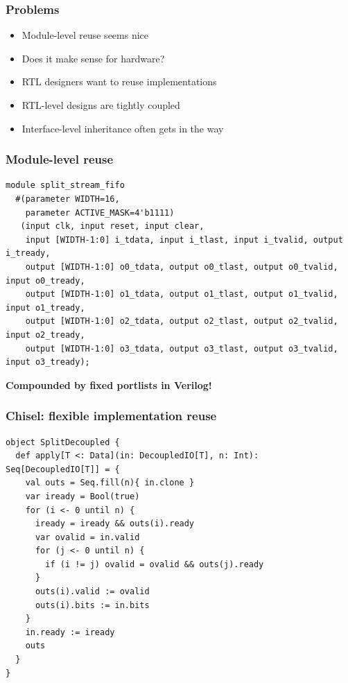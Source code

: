 \documentclass{beamer}
\begin{document}
\begin{frame}
\frametitle{Problems}
\begin{itemize}
\item Module-level reuse seems nice
\item Does it make sense for hardware?
\item<2-> RTL designers want to reuse implementations
\item<2-> RTL-level designs are tightly coupled
\item<2-> Interface-level inheritance often gets in the way
\end{itemize}
\end{frame}

\begin{frame}[fragile]
\frametitle{Module-level reuse}
\tiny
\begin{verbatim}
module split_stream_fifo
  #(parameter WIDTH=16,
    parameter ACTIVE_MASK=4'b1111)
   (input clk, input reset, input clear,
    input [WIDTH-1:0] i_tdata, input i_tlast, input i_tvalid, output i_tready,
    output [WIDTH-1:0] o0_tdata, output o0_tlast, output o0_tvalid, input o0_tready,
    output [WIDTH-1:0] o1_tdata, output o1_tlast, output o1_tvalid, input o1_tready,
    output [WIDTH-1:0] o2_tdata, output o2_tlast, output o2_tvalid, input o2_tready,
    output [WIDTH-1:0] o3_tdata, output o3_tlast, output o3_tvalid, input o3_tready);
\end{verbatim}
\textbf{Compounded by fixed portlists in Verilog!}
\end{frame}

\begin{frame}[fragile]
\frametitle{Chisel: flexible implementation reuse}
\tiny
\begin{verbatim}
object SplitDecoupled {
  def apply[T <: Data](in: DecoupledIO[T], n: Int): Seq[DecoupledIO[T]] = {
    val outs = Seq.fill(n){ in.clone }
    var iready = Bool(true)
    for (i <- 0 until n) {
      iready = iready && outs(i).ready
      var ovalid = in.valid
      for (j <- 0 until n) {
        if (i != j) ovalid = ovalid && outs(j).ready
      }
      outs(i).valid := ovalid
      outs(i).bits := in.bits
    }
    in.ready := iready
    outs
  }
}
\end{verbatim}
\end{frame}
\end{document}

